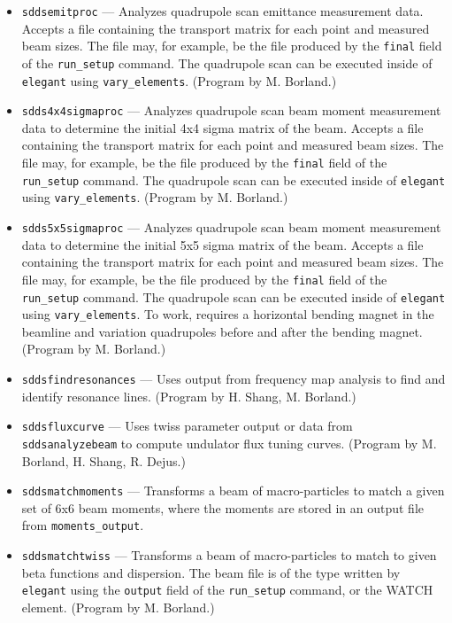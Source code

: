 \documentclass[11pt]{article}
\begin{document}
\begin{itemize}
  (Program by M. Borland.)
\item {\tt sddsemitproc} --- Analyzes quadrupole scan emittance measurement data.  Accepts a
        file containing the transport matrix for each point and measured beam sizes.  
        The file may, for example, be the file produced
        by the {\tt final} field of the {\tt run\_setup} command.  The quadrupole scan can be
        executed inside of {\tt elegant} using {\tt vary\_elements}. (Program by M. Borland.)
\item {\tt sdds4x4sigmaproc} --- Analyzes quadrupole scan beam moment measurement data to determine
  the initial 4x4 sigma matrix of the beam.  Accepts a
  file containing the transport matrix for each point and measured beam sizes.  
  The file may, for example, be the file produced
  by the {\tt final} field of the {\tt run\_setup} command.  The quadrupole scan can be
  executed inside of {\tt elegant} using {\tt vary\_elements}. (Program by M. Borland.)
\item {\tt sdds5x5sigmaproc} --- Analyzes quadrupole scan beam moment measurement data to determine
  the initial 5x5 sigma matrix of the beam.  Accepts a
  file containing the transport matrix for each point and measured beam sizes.  
  The file may, for example, be the file produced
  by the {\tt final} field of the {\tt run\_setup} command.  The quadrupole scan can be
  executed inside of {\tt elegant} using {\tt vary\_elements}. To work, requires a horizontal bending magnet
  in the beamline and variation quadrupoles before and after the bending magnet. (Program by M. Borland.)
\item {\tt sddsfindresonances} --- Uses output from frequency map analysis to find and identify resonance lines.
 (Program by H. Shang, M. Borland.)
\item {\tt sddsfluxcurve} --- Uses twiss parameter output or data from {\tt sddsanalyzebeam} to
  compute undulator flux tuning curves.  (Program by M. Borland, H. Shang, R. Dejus.)
\item {\tt sddsmatchmoments} --- Transforms a beam of macro-particles to match a given set of 
  6x6 beam moments, where the moments are stored in an output file from \verb|moments_output|.
\item {\tt sddsmatchtwiss} --- Transforms a beam of macro-particles to match to given beta
        functions and dispersion.    The beam file
        is of the type written by {\tt elegant} using the {\tt output} field of the {\tt run\_setup}
        command, or the WATCH element. (Program by M. Borland.)

\end{itemize}
\end{document}
